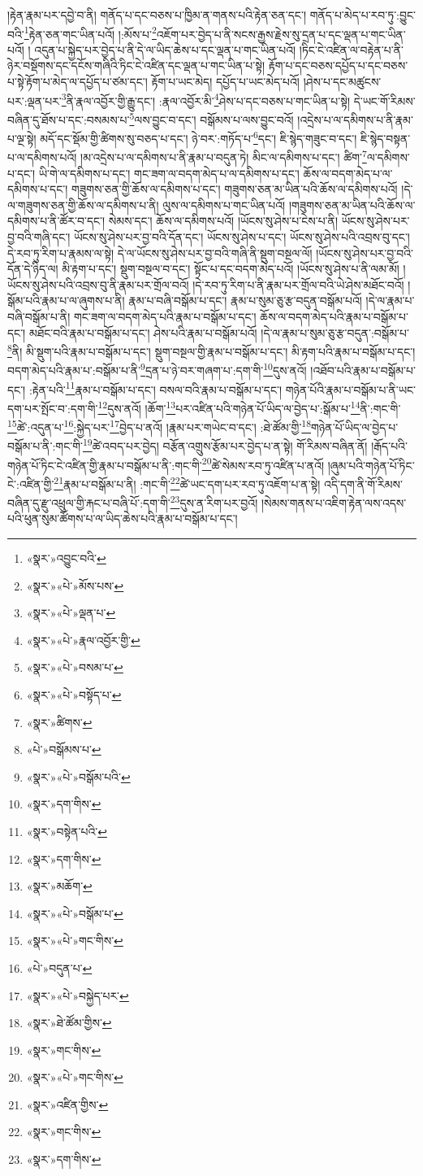 །རྟེན་རྣམ་པར་དབྱེ་བ་ནི། གནོད་པ་དང་བཅས་པ་ཁྱིམ་ན་གནས་པའི་རྟེན་ཅན་དང་། གནོད་པ་མེད་པ་རབ་ཏུ་:བྱུང་བའི་\footnote{«སྣར་»འབྱུང་བའི་}རྟེན་ཅན་གང་ཡིན་པའོ། །:མོས་པ་\footnote{«སྣར་»«པེ་»མོས་པས་}འཇོག་པར་བྱེད་པ་ནི་སངས་རྒྱས་རྗེས་སུ་དྲན་པ་དང་ལྡན་པ་གང་ཡིན་པའོ། །
འདུན་པ་སྐྱེད་པར་བྱེད་པ་ནི་དེ་ལ་ཡིད་ཆེས་པ་དང་ལྡན་པ་གང་ཡིན་པའོ། །ཏིང་ངེ་འཛིན་ལ་བརྟེན་པ་ནི་ཉེར་བསྡོགས་དང་དངོས་གཞིའི་ཏིང་ངེ་འཛིན་དང་ལྡན་པ་གང་ཡིན་པ་སྟེ། རྟོག་པ་དང་བཅས་དཔྱོད་པ་དང་བཅས་པ་སྟེ་རྟོག་པ་མེད་ལ་དཔྱོད་པ་ཙམ་དང་། རྟོག་པ་ཡང་མེད། དཔྱོད་པ་ཡང་མེད་པའོ། །ཤེས་པ་དང་མཚུངས་པར་:ལྡན་པར་\footnote{«སྣར་»«པེ་»ལྡན་པ་}ནི་རྣལ་འབྱོར་གྱི་རྒྱུ་དང་། :རྣལ་འབྱོར་མི་\footnote{«སྣར་»«པེ་»རྣལ་འབྱོར་གྱི་}ཤེས་པ་དང་བཅས་པ་གང་ཡིན་པ་སྟེ། དེ་ཡང་གོ་རིམས་བཞིན་དུ་ཐོས་པ་དང་:བསམས་པ་\footnote{«སྣར་»«པེ་»བསམ་པ་}ལས་བྱུང་བ་དང་། བསྒོམས་པ་ལས་བྱུང་བའོ། །འདྲེས་པ་ལ་དམིགས་པ་ནི་རྣམ་པ་ལྔ་སྟེ། མདོ་དང་སྡོམ་གྱི་ཚིགས་སུ་བཅད་པ་དང་། ཉེ་བར་:གཏོད་པ་\footnote{«སྣར་»«པེ་»བསྟོད་པ་}དང་། ཇི་སྙེད་གཟུང་བ་དང་། ཇི་སྙེད་བསྟན་པ་ལ་དམིགས་པའོ། །མ་འདྲེས་པ་ལ་དམིགས་པ་ནི་རྣམ་པ་བདུན་ཏེ། མིང་ལ་དམིགས་པ་དང་། ཚིག་\footnote{«སྣར་»ཚིགས་}ལ་དམིགས་པ་དང་། ཡི་གེ་ལ་དམིགས་པ་དང་། གང་ཟག་ལ་བདག་མེད་པ་ལ་དམིགས་པ་དང་། ཆོས་ལ་བདག་མེད་པ་ལ་དམིགས་པ་དང་། གཟུགས་ཅན་གྱི་ཆོས་ལ་དམིགས་པ་དང་། གཟུགས་ཅན་མ་ཡིན་པའི་ཆོས་ལ་དམིགས་པའོ། །དེ་ལ་གཟུགས་ཅན་གྱི་ཆོས་ལ་དམིགས་པ་ནི། ལུས་ལ་དམིགས་པ་གང་ཡིན་པའོ། །གཟུགས་ཅན་མ་ཡིན་པའི་ཆོས་ལ་དམིགས་པ་ནི་ཚོར་བ་དང་། སེམས་དང་། ཆོས་ལ་དམིགས་པའོ། །ཡོངས་སུ་ཤེས་པ་ངེས་པ་ནི། ཡོངས་སུ་ཤེས་པར་བྱ་བའི་གཞི་དང་། ཡོངས་སུ་ཤེས་པར་བྱ་བའི་དོན་དང་། ཡོངས་སུ་ཤེས་པ་དང་། ཡོངས་སུ་ཤེས་པའི་འབྲས་བུ་དང་། དེ་རབ་ཏུ་རིག་པ་རྣམས་ལ་སྟེ། དེ་ལ་ཡོངས་སུ་ཤེས་པར་བྱ་བའི་གཞི་ནི་སྡུག་བསྔལ་ལོ། །ཡོངས་སུ་ཤེས་པར་བྱ་བའི་དོན་དེ་ཉིད་ལ། མི་རྟག་པ་དང་། སྡུག་བསྔལ་བ་དང་། སྟོང་པ་དང་བདག་མེད་པའོ། །ཡོངས་སུ་ཤེས་པ་ནི་ལམ་མོ། །ཡོངས་སུ་ཤེས་པའི་འབྲས་བུ་ནི་རྣམ་པར་གྲོལ་བའོ། །དེ་རབ་ཏུ་རིག་པ་ནི་རྣམ་པར་གྲོལ་བའི་ཡེ་ཤེས་མཐོང་བའོ། །སྒོམ་པའི་རྣམ་པ་ལ་ཞུགས་པ་ནི། རྣམ་པ་བཞི་བསྒོམ་པ་དང་། རྣམ་པ་སུམ་ཅུ་རྩ་བདུན་བསྒོམ་པའོ། །དེ་ལ་རྣམ་པ་བཞི་བསྒོམ་པ་ནི། གང་ཟག་ལ་བདག་མེད་པའི་རྣམ་པ་བསྒོམ་པ་དང་། ཆོས་ལ་བདག་མེད་པའི་རྣམ་པ་བསྒོམ་པ་དང་། མཐོང་བའི་རྣམ་པ་བསྒོམ་པ་དང་། ཤེས་པའི་རྣམ་པ་བསྒོམ་པའོ། །དེ་ལ་རྣམ་པ་སུམ་ཅུ་རྩ་བདུན་:བསྒོམ་པ་\footnote{«པེ་»བསྒོམས་པ་}ནི། མི་སྡུག་པའི་རྣམ་པ་བསྒོམ་པ་དང་། སྡུག་བསྔལ་གྱི་རྣམ་པ་བསྒོམ་པ་དང་། མི་རྟག་པའི་རྣམ་པ་བསྒོམ་པ་དང་། བདག་མེད་པའི་རྣམ་པ་:བསྒོམ་པ་ནི་\footnote{«སྣར་»«པེ་»བསྒོམ་པའི་}དྲན་པ་ཉེ་བར་གཞག་པ་:དག་གི་\footnote{«སྣར་»དག་གིས་}དུས་ནའོ། །འཐོབ་པའི་རྣམ་པ་བསྒོམ་པ་དང་། :རྟེན་པའི་\footnote{«སྣར་»བསྟེན་པའི་}རྣམ་པ་བསྒོམ་པ་དང་། བསལ་བའི་རྣམ་པ་བསྒོམ་པ་དང་། གཉེན་པོའི་རྣམ་པ་བསྒོམ་པ་ནི་ཡང་དག་པར་སྤོང་བ་:དག་གི་\footnote{«སྣར་»དག་གིས་}དུས་ནའོ། །ཆོག་\footnote{«སྣར་»མཆོག་}པར་འཛིན་པའི་གཉེན་པོ་ཡིད་ལ་བྱེད་པ་:སྒོམ་པ་\footnote{«སྣར་»«པེ་»བསྒོམ་པ་}ནི་:གང་གི་\footnote{«སྣར་»«པེ་»གང་གིས་}ཚེ་:འདུན་པ་\footnote{«པེ་»བདུན་པ་}:སྐྱེད་པར་\footnote{«སྣར་»«པེ་»བསྐྱེད་པར་}བྱེད་པ་ནའོ། །རྣམ་པར་གཡེང་བ་དང་། :ཐེ་ཚོམ་གྱི་\footnote{«སྣར་»ཐེ་ཚོམ་གྱིས་}གཉེན་པོ་ཡིད་ལ་བྱེད་པ་བསྒོམ་པ་ནི་:གང་གི་\footnote{«སྣར་»གང་གིས་}ཚེ་འབད་པར་བྱེད། བརྩོན་འགྲུས་རྩོམ་པར་བྱེད་པ་ན་སྟེ། གོ་རིམས་བཞིན་ནོ། །རྒོད་པའི་གཉེན་པོ་ཏིང་ངེ་འཛིན་གྱི་རྣམ་པ་བསྒོམ་པ་ནི་:གང་གི་\footnote{«སྣར་»«པེ་»གང་གིས་}ཚེ་སེམས་རབ་ཏུ་འཛིན་པ་ནའོ། །ཞུམ་པའི་གཉེན་པོ་ཏིང་ངེ་:འཛིན་གྱི་\footnote{«སྣར་»འཛིན་གྱིས་}རྣམ་པ་བསྒོམ་པ་ནི། :གང་གི་\footnote{«སྣར་»གང་གིས་}ཚེ་ཡང་དག་པར་རབ་ཏུ་འཇོག་པ་ན་སྟེ། འདི་དག་ནི་གོ་རིམས་བཞིན་དུ་རྫུ་འཕྲུལ་གྱི་རྐང་པ་བཞི་པོ་:དག་གི་\footnote{«སྣར་»དག་གིས་}དུས་ན་རིག་པར་བྱའོ། །སེམས་གནས་པ་འཇིག་རྟེན་ལས་འདས་པའི་ཕུན་སུམ་ཚོགས་པ་ལ་ཡིད་ཆེས་པའི་རྣམ་པ་བསྒོམ་པ་དང་། 